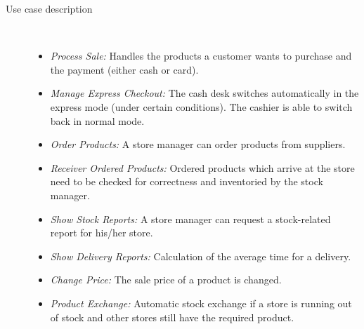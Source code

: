 \begin{description}


 \item[Use case description]~\par
\begin{itemize}
	\item \textit{Process Sale:} Handles the products a customer wants to purchase and the payment (either cash or card).

    \item \textit{Manage Express Checkout:} The cash desk switches automatically in the express mode (under certain conditions). The cashier is able to switch back in normal mode.
    \item \textit{Order Products:} A store manager can order products from suppliers.
    \item \textit{Receiver Ordered Products:} Ordered products which arrive at the store need to be checked for correctness and inventoried by the stock manager.
    \item \textit{Show Stock Reports:} A store manager can request a stock-related report for his/her store.
    \item \textit{Show Delivery Reports:} Calculation of the average time for a delivery.
    \item \textit{Change Price:} The sale price of a product is changed.
    \item \textit{Product Exchange:} Automatic stock exchange if a store is running out of stock and other stores still have the required product.
\end{itemize}


\end{description}